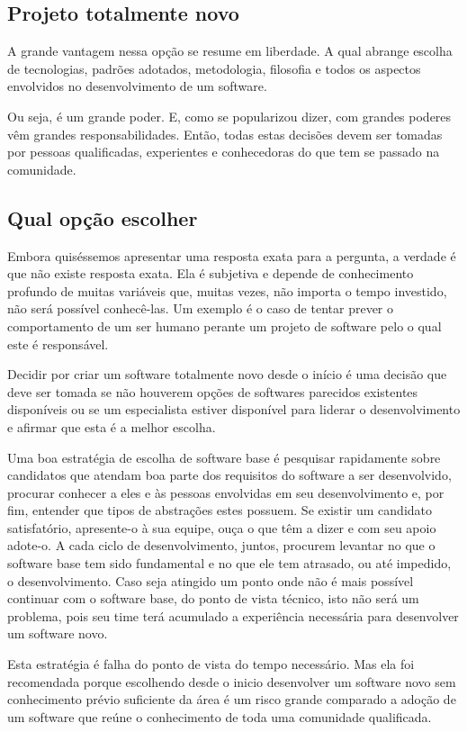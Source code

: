 \documentclass[12pt]{article}
\begin{document}
  \subsection{Projeto totalmente novo} \label{subsec:projeto-novo}
  A grande vantagem nessa opção se resume em liberdade. A qual abrange escolha de tecnologias, padrões adotados, metodologia, filosofia e todos os aspectos envolvidos no desenvolvimento de um software.

  Ou seja, é um grande poder. E, como se popularizou dizer, com grandes poderes vêm grandes responsabilidades. Então, todas estas decisões devem ser tomadas por pessoas qualificadas, experientes e conhecedoras do que tem se passado na comunidade.

  \subsection{Qual opção escolher} \label{subsec:qualopcaoescolher}
  Embora quiséssemos apresentar uma resposta exata para a pergunta, a verdade é que não existe resposta exata. Ela é subjetiva e depende de conhecimento profundo de muitas variáveis que, muitas vezes, não importa o tempo investido, não será possível conhecê-las. Um exemplo é o caso de tentar prever o comportamento de um ser humano perante um projeto de software pelo o qual este é responsável.

  Decidir por criar um software totalmente novo desde o início é uma decisão que deve ser tomada se não houverem opções de softwares parecidos existentes disponíveis ou se um especialista estiver disponível para liderar o desenvolvimento e afirmar que esta é a melhor escolha.

  Uma boa estratégia de escolha de software base é pesquisar rapidamente sobre candidatos que atendam boa parte dos requisitos do software a ser desenvolvido, procurar conhecer a eles e às pessoas envolvidas em seu desenvolvimento e, por fim, entender que tipos de abstrações estes possuem. Se existir um candidato satisfatório, apresente-o à sua equipe, ouça o que têm a dizer e com seu apoio adote-o. A cada ciclo de desenvolvimento, juntos, procurem levantar no que o software base tem sido fundamental e no que ele tem atrasado, ou até impedido, o desenvolvimento. Caso seja atingido um ponto onde não é mais possível continuar com o software base, do ponto de vista técnico, isto não será um problema, pois seu time terá acumulado a experiência necessária para desenvolver um software novo.

  Esta estratégia é falha do ponto de vista do tempo necessário. Mas ela foi recomendada porque escolhendo desde o inicio desenvolver um software novo sem conhecimento prévio suficiente da área é um risco grande comparado a adoção de um software que reúne o conhecimento de toda uma comunidade qualificada.
\end{document}
